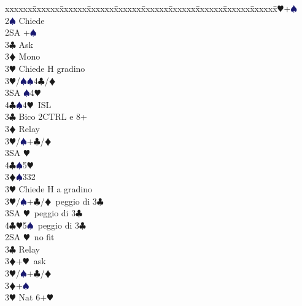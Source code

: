 \documentclass[a4paper,italian]{article}
\newcommand{\BC}{\textcolor{OliveGreen}{$\clubsuit$}}
\newcommand{\BD}{\textcolor{RedOrange}{$\vardiamondsuit$}}
\newcommand{\BH}{\textcolor{Red2}{$\varheartsuit${}}}
\newcommand{\BS}{\textcolor{MidnightBlue}{$\spadesuit${}}}
\newenvironment{bidtable}
{\begin{tabbing}

    xxxxxx\=xxxxxx\=xxxxxx\=xxxxxx\=xxxxxx\=xxxxxx\=xxxxxx\=xxxxxx\=xxxxxx\=xxxxxx\=\kill}
{\end{tabbing} }%
\begin{document}
\begin{multicols}{2}
\begin{bidtable}
                                            2\BH {}+\BS \+\\
                                            2\BS \> Chiede\+\\
                                            2SA +\BS \+\\
                                            3\BC \> Ask\+\\
                                            3\BD \> Mono\+\\
                                            3\BH \> Chiede H gradino\-\\
                                            3\BH/\BS {}\BS 4\BC /\BD \\
                                            3SA \BS 4\BH \\
                                            4\BC {}\BS 4\BH\ ISL\-\-\\
                                            3\BC \> Bico 2CTRL e 8+\+\\
                                            3\BD \> Relay\+\\
                                            3\BH/\BS {}+\BC /\BD \\
                                            3SA \BH \\
                                            4\BC {}\BS 5\BH \-\-\\
                                            3\BD {}\BS 332\+\\
                                            3\BH \> Chiede H a gradino\-\\
                                            3\BH/\BS {}+\BC /\BD\ peggio di 3\BC \\
                                            3SA \BH\ peggio di 3\BC \\
                                            4\BC {}\BH 5\BS\ peggio di 3\BC \-\\
                                            2SA \BH\ no fit\+\\
                                            3\BC \> Relay\+\\
                                            3\BD {}+\BH\ ask\\
                                            3\BH/\BS {}+\BC /\BD \-\\
                                            3\BD {}+\BS \+\\
                                            3\BH \> Nat 6+\BH\\

\end{bidtable}
\end{multicols}
\end{document}
